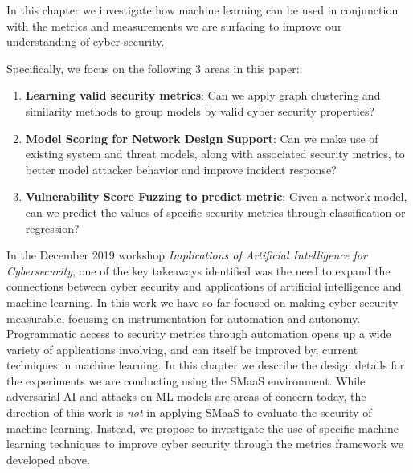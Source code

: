 


In this chapter we investigate how machine learning can be used in conjunction with the metrics and measurements we are surfacing to improve our understanding of cyber security. 

Specifically, we focus on the following 3 areas in this paper:
 
\begin{enumerate}
\item \textbf{Learning valid security metrics}: Can we apply graph clustering and similarity methods to group models by valid cyber security properties?
\item \textbf{Model Scoring for Network Design Support}: Can we make use of existing system and threat models, along with associated security metrics, to better model attacker behavior and improve incident response? 

\item \textbf{Vulnerability Score Fuzzing to predict metric}: Given a network model, can we predict the values of specific security metrics through classification or regression? 
\end{enumerate}


In the December 2019 workshop\textit{ Implications of Artificial Intelligence for Cybersecurity}\cite{Chang_2019}, one of the key takeaways identified was the need to expand the connections between cyber security and applications of artificial intelligence and machine learning. In this work we have so far focused on making cyber security measurable, focusing on instrumentation for automation and autonomy. Programmatic access to security metrics through automation opens up a wide variety of applications involving, and can itself be improved by, current techniques in machine learning. In this chapter we describe the design details for the experiments we are conducting using the SMaaS environment. While adversarial AI and attacks on ML models are areas of concern today, the direction of this work is \textit{not} in applying SMaaS to evaluate the security of machine learning. Instead, we propose to investigate the use of specific machine learning techniques to improve cyber security through the metrics framework we developed above. 
